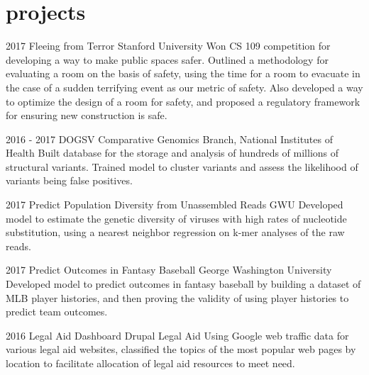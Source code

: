\documentclass[]{friggeri-cv}
\begin{document}
\section{projects}

\begin{entrylist}
  \entry
    {2017}
    {Fleeing from Terror}
    {Stanford University}
    {Won CS 109 competition for developing a way to make public spaces safer. Outlined a methodology for evaluating a room on the basis of safety, using the time for a room to evacuate in the case of a sudden terrifying event as our metric of safety. Also developed a way to optimize the design of a room for safety, and proposed a regulatory framework for ensuring new construction is safe.}

  \entry
    {2016 - 2017}
    {DOGSV}
    {Comparative Genomics Branch, National Institutes of Health}
    {Built database for the storage and analysis of hundreds of millions of structural variants. Trained model to cluster variants and assess the likelihood of variants being false positives.}
    
  \entry
    {2017}
    {Predict Population Diversity from Unassembled Reads} 
    {GWU}
    {Developed model to estimate the genetic diversity of viruses with high rates of nucleotide substitution, using a nearest neighbor regression on k-mer analyses of the raw reads.}
    
    \entry
    {2017}
    {Predict Outcomes in Fantasy Baseball} 
    {George Washington University}
    {Developed model to predict outcomes in fantasy baseball by building a dataset of MLB player histories, and then proving the validity of using player histories to predict team outcomes.}

  \entry
    {2016}
    {Legal Aid Dashboard} 
    {Drupal Legal Aid}
    {Using Google web traffic data for various legal aid websites, classified the topics of the most popular web pages by location to facilitate allocation of legal aid resources to meet need.}
\end{entrylist}
\end{document}
